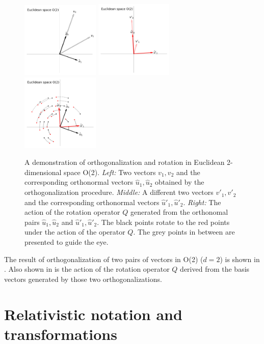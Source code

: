 \documentclass{article}
\begin{document}
\begin{figure}[t]
\includegraphics[width=0.33\textwidth]{E_v.png}%
\includegraphics[width=0.33\textwidth]{E_vp.png}%
\includegraphics[width=0.33\textwidth]{E_Q.png}
\caption{A demonstration of orthogonalization and rotation in Euclidean 2-dimensional space O(2).
\textsl{Left:} Two vectors $v_1, v_2$ and the corresponding orthonormal vectors $\hat{u}_1, \hat{u}_2$ obtained by the orthogonalization procedure.
\textsl{Middle:} A different two vectors $v'_1, v'_2$ and the corresponding orthonormal vectors $\hat{u}'_1, \hat{u}'_2$.
\textsl{Right:} The action of the rotation operator $Q$ generated from the orthonomal pairs $\hat{u}_1, \hat{u}_2$ and $\hat{u}'_1, \hat{u}'_2$.
The black points rotate to the red points under the action of the operator $Q$.
The grey points in between are presented to guide the eye.\label{fig:Euclid}}
\end{figure}
The result of orthogonalization of two pairs of vectors in O(2) ($d=2$) is shown in .
Also shown in  is the action of the rotation operator $Q$ derived from the basis vectors generated by those two orthogonalizations.

\section{Relativistic notation and transformations}\label{sec:notation}
\end{document}
